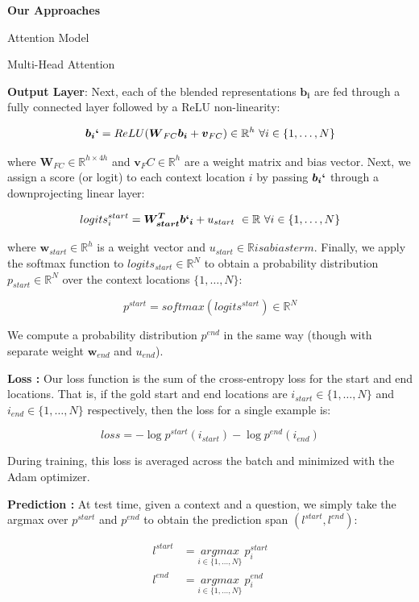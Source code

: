 \documentclass{article}
\newcommand{\tb}[1]{\textbf{#1}}
\newcommand{\mb}[1]{\boldsymbol{#1}}
\begin{document}
\begin{psection}{\textbf{Our Approaches}}
\begin{psubsection}{Attention Model}
\begin{subsubsection}{Multi-Head Attention}
 \end{subsubsection}

\tb{Output Layer}: Next, each of the blended representations $\mb{b_i}$ are fed through a fully connected layer followed by a ReLU non-linearity:

$$\mb{b_i`} = ReLU(\mb{W}_{FC}\mb{b_i} + \mb{v}_{FC})\in \mathbb{R}^h \ \forall i \in \{1,\dots,N\}$$

where $\mb{W}_{FC} \in \mathbb{R}^{h \times 4h}$ and $\mb{v}_FC \in \mathbb{R}^h$ are a weight matrix and bias vector. Next, we assign a score (or logit) to each context location $i$ by passing $\mb{b_i`}$ through a downprojecting linear layer:

$$logits_i^{start} = \mb{W^T_{start}}\mb{b`_i} + u_{start} \ \in \mathbb{R} \ \forall i \in \{1,\dots,N\}$$

where $\mb{w}_{start} \in \mathbb{R}^h$ is a weight vector and $u_{start}\in \mathbb{R} is a bias term$. Finally, we apply the softmax
function to $logits_{start} \in \mathbb{R}^N$ to obtain a probability distribution $p_{start} \in \mathbb{R}^N$ over the context
locations $\{1,\dots,N\}$:

$$p^{start} = softmax(logits^{start}) \in \mathbb{R}^N$$

We compute a probability distribution $p^{end}$ in the same way (though with separate weight $\mb{w}_{end}$ and $u_{end}$).

\tb{Loss : } Our loss function is the sum of the cross-entropy loss for the start and end locations. That is, if the gold start and end locations are $i_{start} \in \{1,\dots,N\}$ and $i_{end} \in \{1,\dots,N\}$ respectively, then the loss for a single example is:

$$loss = -\log p^{start} (i_{start})-\log p^{end}(i_{end})$$

During training, this loss is averaged across the batch and minimized with the Adam optimizer.

\tb{Prediction : }At test time, given a context and a question, we simply take the argmax over $p^{start}$ and $p^{end}$ to obtain the prediction span $(l^{start},l^{end})$:

\begin{align*}
    l^{start} &= \underset{i \in \{1,\dots,N\}}{argmax} \ p_i^{start}\\
    l^{end} &= \underset{i \in \{1,\dots,N\}}{argmax} \ p_i^{end}
\end{align*}
\end{psubsection}

\end{psection}
\end{document}
